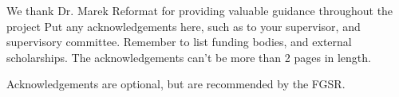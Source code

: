 \documentclass[\main/thesis.tex]{subfiles}
\begin{document}
\begin{acknowledgements} 
We thank Dr. Marek Reformat for providing valuable guidance throughout the project 
Put any acknowledgements here, such as to your supervisor, and supervisory committee.
Remember to list funding bodies, and external scholarships.
The acknowledgements can't be more than 2 pages in length.

Acknowledgements are optional, but are recommended by the FGSR.
\end{acknowledgements}
\end{document}
